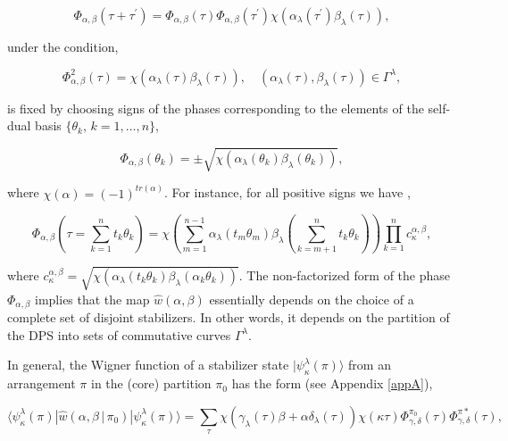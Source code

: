 \documentclass[quantumrep,article,submit,pdftex,moreauthors]{Definitions/mdpi}
\begin{document}
\begin{equation}
  \Phi_{\alpha,\beta}\left(\tau+\tau^{\prime}\right)
  = \Phi_{\alpha,\beta}(\tau) \Phi_{\alpha,\beta }(\tau^{\prime})
  \chi\left( \alpha_{\lambda}(\tau^{\prime}) \beta_{\lambda}(\tau) \right),
  \label{phase 2}
\end{equation}

under the condition,

\begin{equation*}
  \Phi_{\alpha,\beta}^{2}(\tau)
  = \chi\left( \alpha_{\lambda}(\tau) \beta_{\lambda}(\tau ) \right),
  \quad \left(\alpha_{\lambda}(\tau), \beta_{\lambda}(\tau)\right)
  \in \Gamma^{\lambda},
\end{equation*}

is fixed by choosing signs of the phases corresponding to the elements of the
self-dual basis $\{\theta_{k}$, $k=1,\ldots,n\}$,

\begin{equation}
  \Phi_{\alpha,\beta}(\theta_{k})
  = \pm \sqrt{\chi\left(
    \alpha_{\lambda}(\theta_{k})\beta_{\lambda }(\theta_{k})
  \right)},
  \label{Phib}
\end{equation}

where $\chi(\alpha)=(-1)^{tr(\alpha)}$. For instance, for all positive signs we
have \cite{klimov06},

\begin{equation}
  \Phi_{\alpha,\beta}\left(
    \tau = \sum\limits_{k=1}^{n}t_{k}\theta_{k}
  \right)
  = \chi\left(
    \sum\limits_{m=1}^{n-1} \alpha_{\lambda}(t_{m}\theta _{m})\beta_{\lambda}
    \left( \sum\limits_{k=m+1}^{n} t_{k} \theta_{k} \right)
  \right)
  \prod\limits_{k=1}^{n}c_{\kappa }^{\alpha,\beta },
  \label{Phi G}
\end{equation}

where $c_{\kappa}^{\alpha,\beta}=\sqrt{\chi\left(
\alpha_{\lambda}(t_{k}\theta_{k})\beta_{\lambda}\left(\alpha_{k}\theta_{k}\right)
\right)}$. The non-factorized form of the phase $\Phi_{\alpha,\beta}$ implies
that the map $\hat{w}(\alpha,\beta)$ essentially depends on the choice of a
complete set of disjoint stabilizers. In other words, it depends on the
partition of the DPS into sets of commutative curves $\Gamma^{\lambda}$.

In general, the Wigner function of a stabilizer state
$|\psi_{\kappa}^{\lambda}(\pi)\rangle$ from an  arrangement $\pi$ in the (core)
partition $\pi_{0}$ has the form (see Appendix \ref{appA}),

\begin{equation}
  \langle \psi_{\kappa}^{\lambda}(\pi)
  |\hat{w}\left( \alpha,\beta\,|\,\pi_{0}\right)
  |\psi_{\kappa}^{\lambda}(\pi)\rangle
  = \sum_{\tau} \chi\left(
    \gamma_{\lambda}(\tau)\beta+\alpha \delta_{\lambda}(\tau)
  \right)
  \chi(\kappa\tau) \Phi_{\gamma,\delta}^{\pi_{0}}(\tau)
  \Phi_{\gamma,\delta}^{\pi\ast}(\tau),
  \label{WF qubit}
\end{equation}
\end{document}
